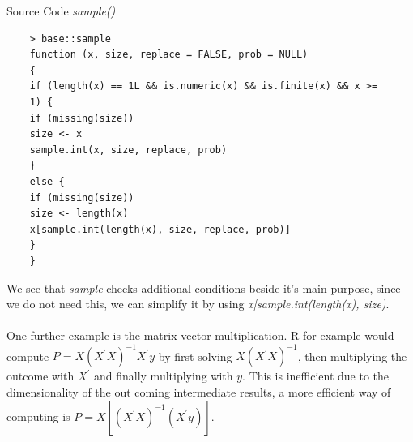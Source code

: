 \documentclass[Research_Module_ES.tex]{subfiles}
\begin{document}
\begin{table}[h]
	\label{sample}
	\caption{Source Code {\itshape sample()}}
	\begin{lstlisting}
	> base::sample
	function (x, size, replace = FALSE, prob = NULL) 
	{
	if (length(x) == 1L && is.numeric(x) && is.finite(x) && x >= 
	1) {
	if (missing(size)) 
	size <- x
	sample.int(x, size, replace, prob)
	}
	else {
	if (missing(size)) 
	size <- length(x)
	x[sample.int(length(x), size, replace, prob)]	
	}
	}
	\end{lstlisting}
\end{table}
We see that {\itshape sample} checks additional conditions beside it's main purpose, since we do not need this, we can simplify it by using {\itshape x[sample.int(length(x), size)}.\\
\\
One further example is the matrix vector multiplication. R for example would compute $P=X(X^\prime X)^{-1}X^\prime y$ by first solving $X(X^\prime X)^{-1}$, then multiplying the outcome with $X^\prime$ and finally multiplying with $y$. This is inefficient due to the dimensionality of the out coming intermediate results, a more efficient way of computing is $P=X[ (X^\prime X)^{-1}(X^\prime y)]$.
\end{document}
